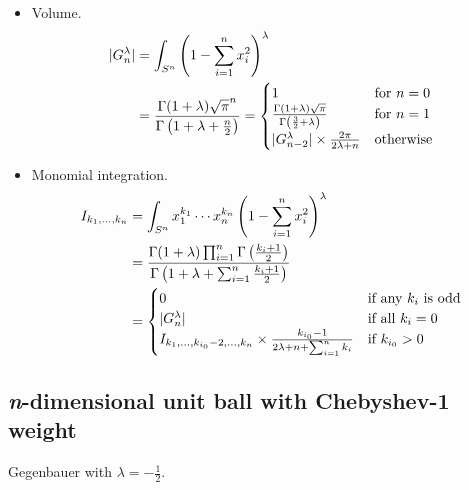\documentclass[final]{scrartcl}
\begin{document}
\begin{itemize}
  \item Volume.
    \begin{align}\nonumber
    |G_n^{\lambda}|
      &= \int_{S^n} \left(1 - \sum_{i=1}^n x_i^2\right)^\lambda\\
      &= \frac{%
        \Gamma(1+\lambda)\sqrt{\pi}^n
      }{%
        \Gamma\left(1+\lambda + \frac{n}{2}\right)
      }
      = \begin{cases}
        1&\text{for $n=0$}\\
        \frac{\Gamma(1+\lambda)\sqrt{\pi}}{\Gamma\left(\frac{3}{2} + \lambda\right)}&\text{for $n=1$}\\
        |G_{n-2}^{\lambda}|\times \frac{2\pi}{2\lambda + n}&\text{otherwise}
      \end{cases}
  \end{align}

  \item Monomial integration.
  \begin{align}\nonumber
    I_{k_1,\dots,k_n}
      &= \int_{S^n} x_1^{k_1}\cdots x_n^{k_n} \left(1 - \sum_{i=1}^n
      x_i^2\right)^\lambda\\
      &= \frac{%
        \Gamma(1+\lambda)\prod_{i=1}^n \Gamma\left(\frac{k_i+1}{2}\right)
      }{%
        \Gamma\left(1+\lambda + \sum_{i=1}^n \frac{k_i+1}{2}\right)
      }\\
      &= \begin{cases}
        0&\text{if any $k_i$ is odd}\\
        |G_n^{\lambda}|&\text{if all $k_i=0$}\\
        I_{k_1,\dots,k_{i_0}-2,\dots,k_n} \times \frac{k_{i_0}-1}{2\lambda + n + \sum_{i=1}^n k_i}&\text{if $k_{i_0} > 0$}
      \end{cases}
  \end{align}
\end{itemize}


\subsection*{\textit{n}-dimensional unit ball with Chebyshev-1 weight}

Gegenbauer with $\lambda=-\frac{1}{2}$.
\end{document}
